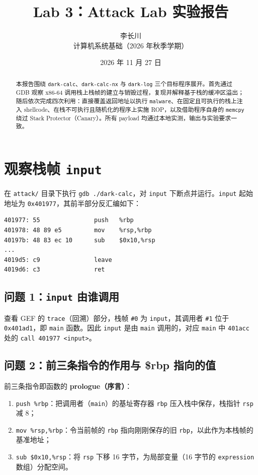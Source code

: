 \documentclass[11pt,a4paper]{article}
\title{\sffamily\bfseries Lab 3：Attack Lab 实验报告}
\author{\sffamily 李长川\\[2pt]\small 计算机系统基础（2026 年秋季学期）}
\date{\sffamily\small 2026 年 11 月 27 日}
\begin{document}
\maketitle
\thispagestyle{empty}

\begin{abstract}\small
\noindent 本报告围绕 \texttt{dark-calc}、\texttt{dark-calc-nx} 与 \texttt{dark-log} 三个目标程序展开。首先通过 GDB 观察 x86-64 调用栈上栈帧的建立与销毁过程，复现并解释基于栈的缓冲区溢出；随后依次完成四次利用：直接覆盖返回地址以执行 \texttt{malware}、在固定且可执行的栈上注入 shellcode、在栈不可执行且随机化的程序上实施 ROP，以及借助程序自身的 \texttt{memcpy} 绕过 Stack Protector（Canary）。所有 payload 均通过本地实测，输出与实验要求一致。
\end{abstract}

\section{观察栈帧 \texttt{input}}

在 \texttt{attack/} 目录下执行 \texttt{gdb ./dark-calc}，对 \texttt{input} 下断点并运行。\texttt{input} 起始地址为 \texttt{0x401977}，其前半部分反汇编如下：

\begin{lstlisting}[language=myasm]
401977: 55               push   %rbp
401978: 48 89 e5         mov    %rsp,%rbp
40197b: 48 83 ec 10      sub    $0x10,%rsp
...
4019d5: c9               leave
4019d6: c3               ret
\end{lstlisting}

\subsection{问题 1：\texttt{input} 由谁调用}

查看 GEF 的 \texttt{trace}（回溯）部分，栈帧 \texttt{\#0} 为 \texttt{input}，其调用者 \texttt{\#1} 位于 \texttt{0x401ad1}，即 \texttt{main} 函数。因此 \texttt{input} 是由 \texttt{main} 调用的，对应 \texttt{main} 中 \texttt{401acc} 处的 \texttt{call 401977 <input>}。

\subsection{问题 2：前三条指令的作用与 \$rbp 指向的值}

前三条指令即函数的 \textbf{prologue（序言）}：

\begin{enumerate}[leftmargin=2em]
  \item \texttt{push \%rbp}：把调用者（\texttt{main}）的基址寄存器 \texttt{rbp} 压入栈中保存，栈指针 \texttt{rsp} 减 8；
  \item \texttt{mov \%rsp,\%rbp}：令当前帧的 \texttt{rbp} 指向刚刚保存的旧 \texttt{rbp}，以此作为本栈帧的基准地址；
  \item \texttt{sub \$0x10,\%rsp}：将 \texttt{rsp} 下移 16 字节，为局部变量（16 字节的 \texttt{expression} 数组）分配空间。
\end{enumerate}
\end{document}
